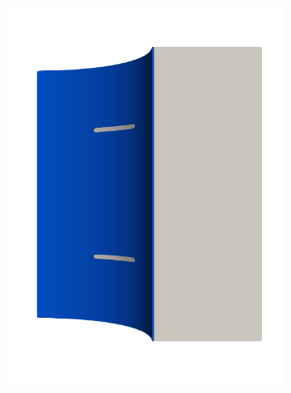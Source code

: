 \begin{frame}
\begin{columns}[T]
\begin{column}{0.6\textwidth}
\begin{figure}
{\begin{subfigure}{0.19\textwidth}
            \includegraphics[width=\textwidth]{examples/figures/seed_ep_1}
          \end{subfigure}
        }
        

\end{figure}
\end{column}
\end{columns}
\end{frame}
